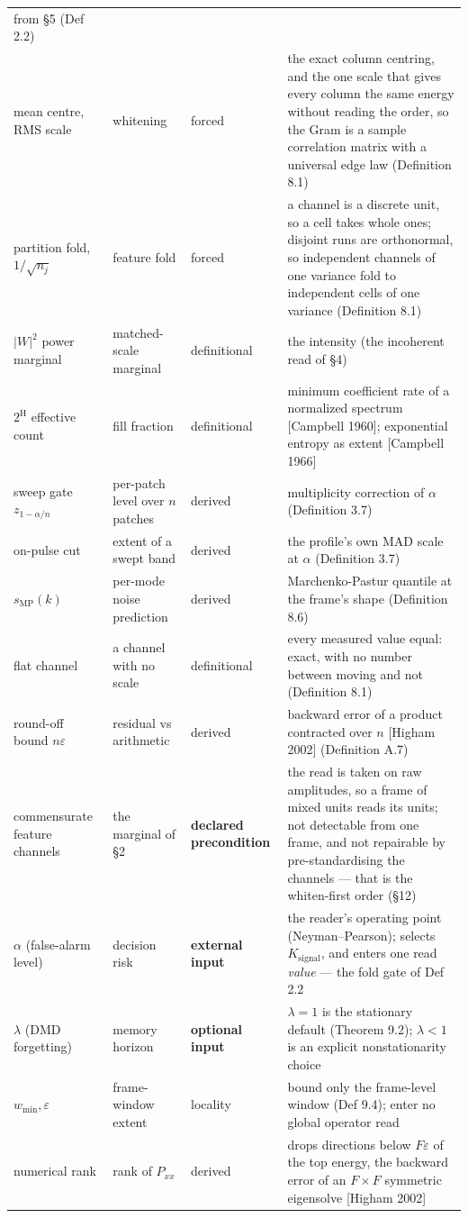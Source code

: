 \documentclass[10pt,letterpaper,twocolumn]{article}
\begin{document}
\begin{table}[tp]
\begin{tabular}{L{0.239\textwidth}L{0.108\textwidth}L{0.173\textwidth}L{0.413\textwidth}}
from §5 (Def 2.2) \\
mean centre, RMS scale & whitening & forced & the exact column centring, and the one scale that gives every column the
same energy without reading the order, so the Gram is a sample
correlation matrix with a universal edge law (Definition 8.1) \\
partition fold, \(1/\sqrt{n_j}\) & feature fold & forced & a channel is a discrete unit, so a cell takes whole ones; disjoint runs
are orthonormal, so independent channels of one variance fold to
independent cells of one variance (Definition 8.1) \\
\(\lvert W\rvert^2\) power marginal & matched-scale marginal & definitional & the intensity (the incoherent read of §4) \\
\(2^{\mathrm H}\) effective count & fill fraction & definitional & minimum coefficient rate of a normalized spectrum {[}Campbell 1960{]};
exponential entropy as extent {[}Campbell 1966{]} \\
sweep gate \(z_{1-\alpha/n}\) & per-patch level over \(n\) patches & derived & multiplicity correction of \(\alpha\) (Definition 3.7) \\
on-pulse cut & extent of a swept band & derived & the profile's own MAD scale at \(\alpha\) (Definition 3.7) \\
\(s_{\mathrm{MP}}(k)\) & per-mode noise prediction & derived & Marchenko-Pastur quantile at the frame's shape (Definition 8.6) \\
flat channel & a channel with no scale & definitional & every measured value equal: exact, with no number between moving and not
(Definition 8.1) \\
round-off bound \(n\varepsilon\) & residual vs arithmetic & derived & backward error of a product contracted over \(n\) {[}Higham 2002{]}
(Definition A.7) \\
commensurate feature channels & the marginal of §2 & \textbf{declared precondition} & the read is taken on raw amplitudes, so a frame of mixed units reads its
units; not detectable from one frame, and not repairable by
pre-standardising the channels --- that is the whiten-first order (§12) \\
\(\alpha\) (false-alarm level) & decision risk & \textbf{external input} & the reader's operating point (Neyman--Pearson); selects
\(K_{\mathrm{signal}}\), and enters one read \emph{value} --- the fold
gate of Def 2.2 \\
\(\lambda\) (DMD forgetting) & memory horizon & \textbf{optional input} & \(\lambda=1\) is the stationary default (Theorem 9.2); \(\lambda<1\) is
an explicit nonstationarity choice \\
\(w_{\min},\varepsilon\) & frame-window extent & locality & bound only the frame-level window (Def 9.4); enter no global operator
read \\
numerical rank & rank of \(P_{xx}\) & derived & drops directions below \(F\varepsilon\) of the top energy, the backward
error of an \(F\times F\) symmetric eigensolve {[}Higham 2002{]} \\
\bottomrule
\end{tabular}
\end{table}
\end{document}

